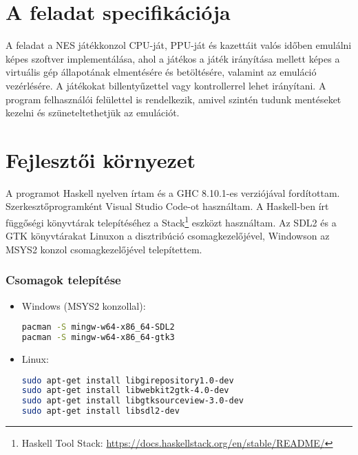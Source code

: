 \section{A feladat specifikációja}

A feladat a NES játékkonzol CPU-ját, PPU-ját és kazettáit valós időben emulálni képes szoftver implementálása, ahol a játékos a játék irányítása mellett képes a virtuális gép állapotának elmentésére és betöltésére, valamint az emuláció vezérlésére. A játékokat billentyűzettel vagy kontrollerrel lehet irányítani. A program felhasználói felülettel is rendelkezik, amivel szintén tudunk mentéseket kezelni és szüneteltethetjük az emulációt.

\section{Fejlesztői környezet}

A programot Haskell nyelven írtam és a GHC 8.10.1-es verziójával fordítottam. Szerkesztőprogramként Visual Studio Code-ot használtam. A Haskell-ben írt függőségi könyvtárak telepítéséhez a Stack\footnote{Haskell Tool Stack: \url{https://docs.haskellstack.org/en/stable/README/}} eszközt használtam.
Az SDL2 és a GTK könyvtárakat Linuxon a disztribúció csomagkezelőjével, Windowson az MSYS2 konzol csomagkezelőjével telepítettem. 
\clearpage
\subsubsection{Csomagok telepítése}
\begin{itemize}
	\item Windows (MSYS2 konzollal):
\begin{lstlisting}[language=bash]
pacman -S mingw-w64-x86_64-SDL2
pacman -S mingw-w64-x86_64-gtk3
\end{lstlisting}
	\item Linux:
\begin{lstlisting}[language=bash]
sudo apt-get install libgirepository1.0-dev
sudo apt-get install libwebkit2gtk-4.0-dev
sudo apt-get install libgtksourceview-3.0-dev
sudo apt-get install libsdl2-dev
\end{lstlisting}
\end{itemize}

